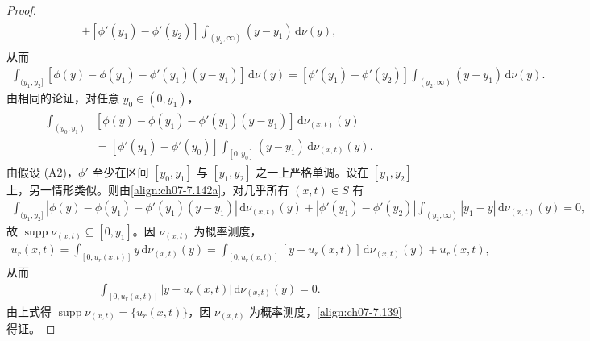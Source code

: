 \documentclass[../../main.tex]{subfiles}%
\begin{document}
\begin{proof}
\begin{align*}
\begin{aligned}
+[\phi'(y_1)-\phi'(y_2)]\int_{(y_2,\infty)}(y-y_1)\,\mathrm{d}\nu(y),
\end{aligned}
\end{align*}
从而
\begin{align}
\int_{(y_1,y_2]}[\phi(y)-\phi(y_1)-\phi'(y_1)(y-y_1)]\,\mathrm{d}\nu(y)
=[\phi'(y_1)-\phi'(y_2)]\int_{(y_2,\infty)}(y-y_1)\,\mathrm{d}\nu(y). \label{align:ch07-7.142a}
\end{align}
由相同的论证，对任意 $y_0\in(0,y_1)$，
\begin{align}
\begin{aligned}
\int_{(y_0,y_1)}&[\phi(y)-\phi(y_1)-\phi'(y_1)(y-y_1)]\,\mathrm{d}\nu_{(x,t)}(y)\\
&=[\phi'(y_1)-\phi'(y_0)]\int_{[0,y_0]}(y-y_1)\,\mathrm{d}\nu_{(x,t)}(y).
\end{aligned} 
\label{align:ch07-7.142b}
\end{align}
由假设 (A2)，$\phi'$ 至少在区间 $[y_0,y_1]$ 与 $[y_1,y_2]$ 之一上严格单调。设在 $[y_1,y_2]$ 上，另一情形类似。则由\eqref{align:ch07-7.142a}，对几乎所有 $(x,t)\in S$ 有
\begin{align*}
\int_{(y_1,y_2]}|\phi(y)-\phi(y_1)-\phi'(y_1)(y-y_1)|\,\mathrm{d}\nu_{(x,t)}(y)
+|\phi'(y_1)-\phi'(y_2)|\int_{(y_2,\infty)}|y_1-y|\,\mathrm{d}\nu_{(x,t)}(y)=0,
\end{align*}
故 $\operatorname{supp}\nu_{(x,t)}\subseteq[0,y_1]$。因 $\nu_{(x,t)}$ 为概率测度，
\begin{align*}
u_r(x,t)=\int_{[0,u_r(x,t)]}y\,\mathrm{d}\nu_{(x,t)}(y)
=\int_{[0,u_r(x,t)]}[y-u_r(x,t)]\,\mathrm{d}\nu_{(x,t)}(y)+u_r(x,t),
\end{align*}
从而
\begin{align*}
\int_{[0,u_r(x,t)]}|y-u_r(x,t)|\,\mathrm{d}\nu_{(x,t)}(y)=0.
\end{align*}
由上式得 $\operatorname{supp}\nu_{(x,t)}=\{u_r(x,t)\}$，因 $\nu_{(x,t)}$ 为概率测度，\eqref{align:ch07-7.139}得证。
\end{proof}
\end{document}
